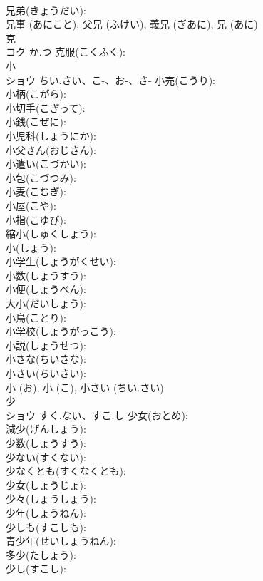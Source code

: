 \documentclass[8pt]{extreport}
\begin{document}
\begin{CJK}{UTF8}{min}
\\	兄弟(きょうだい): 
\\	兄事 (あにこと), 父兄 (ふけい), 義兄 (ぎあに), 兄 (あに)
\\	克			
\\	コク	か.つ	克服(こくふく): 
\\	小			
\\	ショウ	ちい.さい、こ-、お-、さ-	小売(こうり): 
\\	小柄(こがら): 
\\	小切手(こぎって): 
\\	小銭(こぜに): 
\\	小児科(しょうにか): 
\\	小父さん(おじさん): 
\\	小遣い(こづかい): 
\\	小包(こづつみ): 
\\	小麦(こむぎ): 
\\	小屋(こや): 
\\	小指(こゆび): 
\\	縮小(しゅくしょう): 
\\	小(しょう): 
\\	小学生(しょうがくせい): 
\\	小数(しょうすう): 
\\	小便(しょうべん): 
\\	大小(だいしょう): 
\\	小鳥(ことり): 
\\	小学校(しょうがっこう): 
\\	小説(しょうせつ): 
\\	小さな(ちいさな): 
\\	小さい(ちいさい): 
\\	小 (お), 小 (こ), 小さい (ちい.さい)
\\	少			
\\	ショウ	すく.ない、すこ.し	少女(おとめ): 
\\	減少(げんしょう): 
\\	少数(しょうすう): 
\\	少ない(すくない): 
\\	少なくとも(すくなくとも): 
\\	少女(しょうじょ): 
\\	少々(しょうしょう): 
\\	少年(しょうねん): 
\\	少しも(すこしも): 
\\	青少年(せいしょうねん): 
\\	多少(たしょう): 
\\	少し(すこし): 

\end{CJK}
\end{document}
